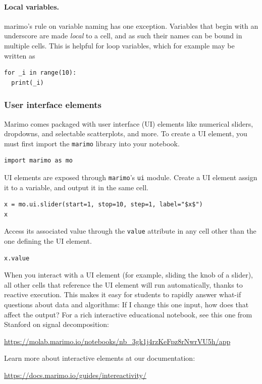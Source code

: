 \documentclass{article}
\begin{document}
\paragraph{Local variables.} marimo's rule on variable naming has one exception. Variables that begin with
an underscore are made \emph{local} to a cell, and as such their names can be
bound in multiple cells. This is helpful for loop variables, which for
example may be written as
\begin{lstlisting}
for _i in range(10):
  print(_i)
\end{lstlisting}

\subsubsection{User interface elements} Marimo comes packaged with user interface
(UI) elements like numerical sliders, dropdowns, and selectable scatterplots,
and more. To create a UI element, you must first import the \verb|marimo|
library into your notebook.
\begin{lstlisting}
import marimo as mo
\end{lstlisting}

UI elements are exposed through \verb|marimo|'s \verb|ui| module. Create a UI element
assign it to a variable, and output it in the same cell.
\begin{lstlisting}
x = mo.ui.slider(start=1, stop=10, step=1, label="$x$")
x
\end{lstlisting}
Access its associated value through the \verb|value| attribute in any cell
other than the one defining the UI element.
\begin{lstlisting}
x.value
\end{lstlisting}
When you interact with a UI element (for example, sliding the knob of a slider), all other
cells that reference the UI element will run automatically, thanks to reactive execution.
This makes it easy for students to rapidly answer what-if questions about data
and algorithms: If I change this one input, how does that affect the output?
For a rich interactive educational notebook, see this one from Stanford
on signal decomposition:

\begin{center}
  \url{https://molab.marimo.io/notebooks/nb_3gk1j4rzKeFpz8rNwrVU5h/app}
\end{center}

Learn more about interactive elements at our documentation:
\begin{center}
  \url{https://docs.marimo.io/guides/intereactivity/}
\end{center}
\end{document}
